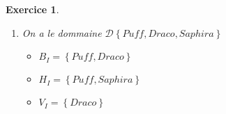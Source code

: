 \documentclass{article}
\theoremstyle{plain}
\newtheorem{exo}{Exercice}%
\begin{document}
\begin{exo}
\begin{enumerate}
\begin{itemize}
        \item $D \overset{def}{=} \forall x, B(x) \Rightarrow H(x)$

        \begin{align*}
            \neg D &\equiv \neg (\forall x, \neg B(x) \vee H(x)) \\
                &\equiv \exists x, B(x) \land \neg H(x) \\
                &\leadsto B(a) \land \neg H(a)
        \end{align*}
        $\left\{B(a), \neg H(a)\right\}$ \vspace{5mm}
    \end{itemize}

    Pour montrer $A, B, C \models D$ on va utiliser la forme clausale de
    l'ensemble de formules:\\ 
    $\left\{A, B, C, \neg D\right\} =$

    $\left\{(P(x, f(x)) \vee H(x)), (\neg V(f(x)) \vee H(x)), (\neg B(x) \vee V(x)),
    (\neg B(y) \vee \neg P(y, x) \vee B(x)), B(a), \neg H(a)
    \right\} $
    \footnotesize
    \[
      \infer{\bot}{
        \neg H(a) & 
      \infer{H(a)}{
      B(a) &
      \infer{\neg B(a) \vee H(a)}{
        \infer{P(a, f(a)) \vee H(a)}{P(x, f(x) \vee H(x))} &
        \infer{\neg B(a) \vee \neg P(a, f(a))}{
          \infer{\neg B(y) \vee \neg P(y, f(a))}{
          \infer{\neg B(y) \vee \neg P(y, f(a)) \vee B(f(a))}{
          \neg B(y) \vee \neg P(y, x) \vee B(x)}&
      \infer{\neg B(f(a))}{
        \infer{V(f(a)) \vee \neg B(f(a))}{V(x) \vee \neg B(x)}&
        \infer{\neg V(f(a))}{
          \neg H(a) &
          \infer{\neg V(f(a)) \vee H(a)}{\neg V(f(x)) \vee H(x)}
        }
      }}}}}}
    \]\normalsize

  \item On a le dommaine $\mathcal{D} \left\{Puff, Draco, Saphira\right\}$
      \begin{itemize}
        \item $B_I = \left\{Puff, Draco\right\}$

        \item $H_I = \left\{Puff, Saphira\right\}$

        \item $V_I = \left\{Draco\right\}$
    \end{itemize}
\end{enumerate}
\end{exo}
\end{document}
